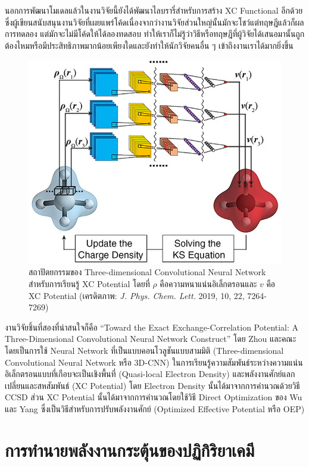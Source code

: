 นอกการพัฒนาโมเดลแล้วในงานวิจัยนี้ยังได้พัฒนาไลบรารี่สำหรับการสร้าง XC Functional อีกด้วยซึ่งผู้เขียนสนับสนุนงานวิจัยที่เผยแพร่โค้ดเนื่องจากว่างานวิจัยส่วนใหญ่นั้นมักจะโชว์แต่ทฤษฎีแล้วก็ผลการทดลอง แต่มักจะไม่มีโค้ดให้ได้ลองทดสอบ ทำให้เราก็ไม่รู้ว่าวิธีหรือทฤษฎีที่ผู้วิจัยได้เสนอมานั้นถูกต้องไหมหรือมีประสิทธิภาพมากน้อยเพียงใดและยังทำให้นักวิจัยคนอื่น ๆ เข้าถึงงานเราได้มากยิ่งขึ้น

\begin{figure}[H]
    \centering
    \includegraphics[width=0.6\linewidth]{fig/ml-xc-conv-network.jpeg}
    \caption{สถาปัตยกรรมของ Three-dimensional Convolutional Neural Network สำหรับการเรียนรู้ XC Potential โดยที่ $\rho$ คือความหนาแน่นอิเล็กตรอนและ $v$ คือ XC Potential (เครดิตภาพ: \textit{J. Phys. Chem. Lett.} 2019, 10, 22, 7264-7269)}
    \label{fig:xc_3dcnn}
\end{figure}

งานวิจัยชิ้นที่สองที่น่าสนใจก็คือ \enquote{Toward the Exact Exchange-Correlation Potential: A Three-Dimensional Convolutional Neural Network Construct} โดย Zhou และคณะ\autocite{zhou2019} โดยเป็นการใช้ Neural Network ที่เป็นแบบคอนโวลูชันแบบสามมิติ (Three-dimensional Convolutional Neural Network หรือ 3D-CNN) ในการเรียนรู้ความสัมพันธ์ระหว่างความแน่นอิเล็กตรอนแบบที่เกือบจะเป็นเชิงพื้นที่ (Quasi-local Electron Density) และพลังงานศักย์แลกเปลี่ยนและสหสัมพันธ์ (XC Potential) โดย Electron Density นั้นได้มาจากการคำนวณด้วยวิธี CCSD ส่วน XC Potential นั้นได้มาจากการคำนวณโดยใช้วิธี Direct Optimization ของ Wu และ Yang\autocite{wu2003} ซึ่งเป็นวิธีสำหรับการปรับพลังงานศักย์ (Optimized Effective Potential หรือ OEP)

\section{การทำนายพลังงานกระตุ้นของปฏิกิริยาเคมี}
\label{sec:pred_act_ener}

